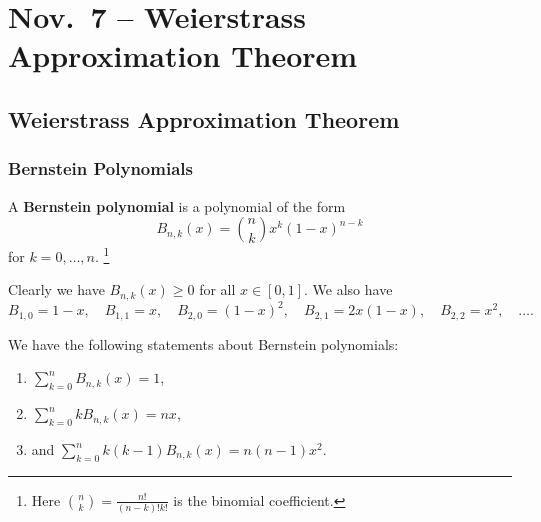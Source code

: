 \chapter{Nov.~7 -- Weierstrass Approximation Theorem}

\section{Weierstrass Approximation Theorem}

\subsection{Bernstein Polynomials}
\begin{definition}
  A \textbf{Bernstein polynomial} is a polynomial
  of the form
  \[
    B_{n, k}(x) = \binom{n}{k} x^k (1 - x)^{n - k}
  \]
  for $k = 0, \dots, n$.
  \footnote{Here $\binom{n}{k} = \frac{n!}{(n - k)!k!}$ is
  the binomial coefficient.}
\end{definition}

Clearly we have $B_{n, k}(x) \ge 0$ for all $x \in [0, 1]$.
We also have
\[
  B_{1, 0} = 1 - x, \quad B_{1, 1} = x, \quad
  B_{2, 0} = (1 - x)^2, \quad B_{2, 1} = 2x(1 - x), \quad
  B_{2, 2} = x^2, \quad \dots
.\]

\begin{lemma}
  We have the following statements about
  Bernstein polynomials:
  \begin{enumerate}
    \item $\sum_{k = 0}^n B_{n, k}(x) = 1$,
    \item $\sum_{k = 0}^n k B_{n, k}(x) = nx$,
    \item and $\sum_{k = 0}^n k(k - 1) B_{n, k}(x) = n(n - 1)x^2$.
  \end{enumerate}
\end{lemma}

